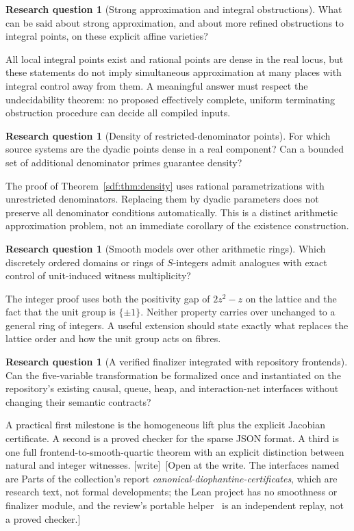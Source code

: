 \documentclass[11pt,a4paper]{article}
\theoremstyle{definition}
\newtheorem{question}[theorem]{Research question}
\theoremstyle{remark}
\newcommand{\wtag}{\textup{[write]}}
\begin{document}
\begin{question}[Strong approximation and integral obstructions]\label{sdf:q:strong}
What can be said about strong approximation, and about more refined
obstructions to integral points, on these explicit affine varieties?
\end{question}
All local integral points exist and rational points are dense in the real
locus, but these statements do not imply simultaneous approximation at
many places with integral control away from them. A meaningful answer must
respect the undecidability theorem: no proposed effectively complete,
uniform terminating obstruction procedure can decide all compiled inputs.

\begin{question}[Density of restricted-denominator points]\label{sdf:q:dyadicdensity}
For which source systems are the dyadic points dense in a real component?
Can a bounded set of additional denominator primes guarantee density?
\end{question}
The proof of Theorem~\ref{sdf:thm:density} uses rational parametrizations with
unrestricted denominators. Replacing them by dyadic parameters does not
preserve all denominator conditions automatically. This is a distinct
arithmetic approximation problem, not an immediate corollary of the
existence construction.

\begin{question}[Smooth models over other arithmetic rings]\label{sdf:q:rings}
Which discretely ordered domains or rings of $S$-integers admit analogues
with exact control of unit-induced witness multiplicity?
\end{question}
The integer proof uses both the positivity gap of $2z^2-z$ on the lattice
and the fact that the unit group is $\{\pm1\}$. Neither property carries
over unchanged to a general ring of integers. A useful extension should
state exactly what replaces the lattice order and how the unit group acts
on fibres.

\begin{question}[A verified finalizer integrated with repository frontends]\label{sdf:q:verified}
Can the five-variable transformation be formalized once and instantiated
on the repository's existing causal, queue, heap, and interaction-net
interfaces without changing their semantic contracts?
\end{question}
A practical first milestone is the homogeneous lift plus the explicit
Jacobian certificate. A second is a proved checker for the sparse JSON
format. A third is one full frontend-to-smooth-quartic theorem with an
explicit distinction between natural and integer witnesses.
\wtag\ [Open at the write. The interfaces named are Parts of the
collection's report \emph{canonical-diophantine-certificates}, which are
research text, not formal developments; the Lean project
 has no smoothness or finalizer
module, and the review's portable helper~\cite{review13} is an independent
replay, not a proved checker.]
\end{document}
